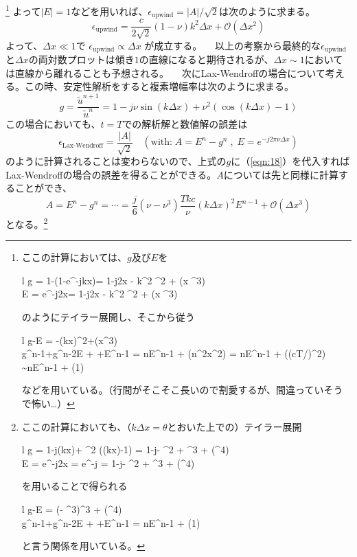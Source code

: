 \documentclass[ja=standard,xelatex]{bxjsarticle}
\newcommand{\vs}[1]{\vskip#1\baselineskip}
\newcommand{\neqn}[1]{\begin{equation}{#1}\end{equation}}
\newcommand{\neqns}[2]{\begin{IEEEeqnarray}{#1}#2\end{IEEEeqnarray}}
\newcommand{\bracketnormal}[1]{\left(#1\right)}
\newcommand{\absdefined}[1]{\left| #1 \right|}
\newcommand{\labeqn}[1]{\label{eqn:#1}}
\newcommand{\refeqn}[1]{（\ref{eqn:#1}）}
\begin{document}
\footnote{
  ここの計算においては、$g$及び$E$を
  \neqns{l}{
    g = 1-\nu\bracketnormal{1-e^{-jk\Delta x}}= 1-\nu j2\pi \Delta x - \dfrac{\nu}{2} k^2 \Delta ^2 + \mathcal{O}\bracketnormal{\Delta x ^3} \\
    E = e^{-j2\pi \nu \Delta x}= 1-\nu j2\pi \Delta x - \dfrac{\nu^2}{2} k^2 \Delta ^2 + \bracketnormal{\Delta x ^3}
  }
  のようにテイラー展開し、そこから従う
  \neqns{l}{
    g-E = -\dfrac{\nu\bracketnormal{1-\nu}}{2}\bracketnormal{k\Delta x}^2+\mathcal{O}\bracketnormal{\Delta x^3}\\
    g^{n-1}+g^{n-2}E + \cdots +E^{n-1} = nE^{n-1} + \mathcal{O}\bracketnormal{n^2\Delta x^2} = nE^{n-1} + \mathcal{O}\bracketnormal{\bracketnormal{cT/\nu}^2} \sim nE^{n-1} + \mathcal{O}\bracketnormal{1}
  }
  などを用いている。（行間がそこそこ長いので割愛するが、間違っていそうで怖い…）
}
よって$\absdefined{E}=1$などを用いれば、$\epsilon_\text{upwind} = \absdefined{A}/\sqrt{2}$は次のように求まる。
\neqn{
  \epsilon_\text{upwind} = \dfrac{c}{2\sqrt{2}}\bracketnormal{1-\nu}k^2\Delta x + \mathcal{O}\bracketnormal{\Delta x^2}
}
よって、$\Delta x \ll 1$で
$
  \epsilon_\text{upwind} \propto \Delta x
$
が成立する。
\vs{0}
　以上の考察から最終的な$\epsilon_\text{upwind}$と$\Delta x$の両対数プロットは傾き$1$の直線になると期待されるが、$\Delta x \sim 1$においては直線から離れることも予想される。
\vs{1}
　次にLax-Wendroffの場合について考える。この時、安定性解析をすると複素増幅率は次のように求まる。
\neqn{
  g = \dfrac{\tilde{u}^{n+1}}{\tilde{u}^n} = 1-j\nu \sin\bracketnormal{k\Delta x}+ \nu ^2 \bracketnormal{\cos\bracketnormal{k\Delta x}-1}\labeqn{18}
}
この場合においても、$t=T$での解析解と数値解の誤差は
\neqn{
  \epsilon_\text{Lax-Wendroff} = \dfrac{\absdefined{A}}{\sqrt{2}} \quad \bracketnormal{\text{with:}\; A = E^n-g^n\;,\; E = e^{-j2\pi \nu \Delta x}}
}
のように計算されることは変わらないので、上式の$g$に\refeqn{18}を代入すればLax-Wendroffの場合の誤差を得ることができる。$A$については先と同様に計算することができ、
\neqn{
  A  =  E^n - g^n =\cdots = \dfrac{j}{6}\bracketnormal{\nu - \nu^3}\dfrac{Tk c}{\nu}\bracketnormal{k\Delta x}^2 E^{n-1} + \mathcal{O}\bracketnormal{\Delta x^3}
}
となる。\footnote{
  ここの計算においても、（$k\Delta x=\theta$とおいた上での）テイラー展開
  \neqns{l}{
    g = 1-j\nu \sin\bracketnormal{k\Delta x}+ \nu ^2 \bracketnormal{\cos\bracketnormal{k\Delta x}-1} = 1-j\nu \theta -\dfrac{\nu^2}{2} \theta ^2 + \dfrac{j\nu}{6}\theta^3 + \mathcal{O}\bracketnormal{\theta^4} \\
    E = e^{-j2\pi \nu \Delta x} = e^{-j \nu \theta} = 1-j\nu\theta - \dfrac{\nu^2}{2}\theta^2 + \dfrac{j\nu^3}{6}\theta^3 + \bracketnormal{\theta^4}
  }
  を用いることで得られる
  \neqns{l}{
    g-E = \bracketnormal{\nu - \nu^3}\theta^3 + \mathcal{O}\bracketnormal{\theta^4}\\
    g^{n-1}+g^{n-2}E + \cdots +E^{n-1} = nE^{n-1} + \mathcal{O}\bracketnormal{1}
  }
  と言う関係を用いている。
}
\end{document}
